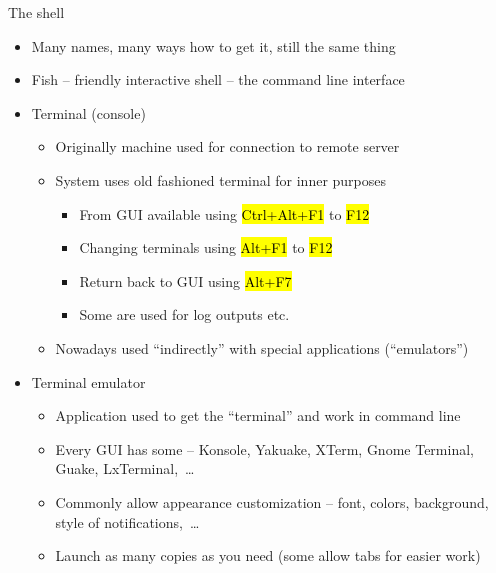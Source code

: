 \documentclass[compress, ucs, xelatex, 11pt, xcolor=svgnames,
  hyperref={
    bookmarks=true,
    unicode=true,
    colorlinks=true,
    pdftitle={Linux, command line and MetaCentrum},
    plainpages=false,
    pdfauthor={Vojtech Zeisek},
    pdfsubject={Course about use of Linux command line, writing shell scripts and using MetaCentrum of CESNET},
    pdfcreator={XeLaTeX},
    pdfkeywords={Linux, GNU, BASH, shell, command line, MetaCentrum},
    linkcolor=Red,
    anchorcolor=Blue,
    citecolor=Purple,
    filecolor=DodgerBlue,
    menucolor=DarkOrchid,
    urlcolor=DeepSkyBlue,
    pdftex},
  url={hyphens, lowtilde} %
  ]{beamer}
\renewcommand{\texttt}[1]{\hl{\ttfamily #1}}
\begin{document}
\begin{frame}{The shell}
\begin{itemize}
  \item Many names, many ways how to get it, still the same thing
  \item Fish -- friendly interactive shell -- the command line interface
  \item Terminal (console)
  \begin{itemize}
    \item Originally machine used for connection to remote server
    \item System uses old fashioned terminal for inner purposes
    \begin{itemize}
      \item From GUI available using \texttt{Ctrl+Alt+F1} to \texttt{F12}
      \item Changing terminals using \texttt{Alt+F1} to \texttt{F12}
      \item Return back to GUI using \texttt{Alt+F7}
      \item Some are used for log outputs etc.
    \end{itemize}
    \item Nowadays used ``indirectly'' with special applications (``emulators'')
  \end{itemize}
  \item Terminal emulator
  \begin{itemize}
    \item Application used to get the ``terminal'' and work in command line
    \item Every GUI has some -- Konsole, Yakuake, XTerm, Gnome Terminal, Guake, LxTerminal,~\ldots
    \item Commonly allow appearance customization -- font, colors, background, style of notifications,~\ldots
    \item Launch as many copies as you need (some allow tabs for easier work)
  \end{itemize}
\end{itemize}
\end{frame}
\end{document}
